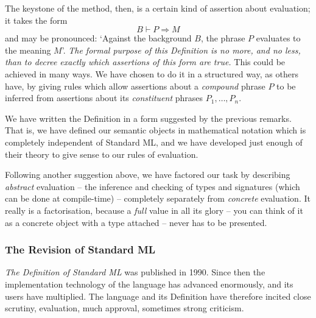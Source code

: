 The keystone of the method, then, is a certain kind of assertion about
evaluation; it takes the form
\[ B\vdash P\Rightarrow M\]
and may be pronounced: `Against the background $B$, the phrase $P$ evaluates
to the meaning $M$'.  {\sl The formal purpose of this Definition is no more, 
and no less, than to decree exactly which assertions of this form are true.}
This could be achieved in many ways. We have chosen to do it in a structured
way, as others have, by giving rules which allow assertions about a 
{\sl compound} phrase $P$ to be inferred from assertions about its
{\sl constituent} phrases $P_1,\ldots,P_n$.

We have written the Definition in a form suggested by the previous remarks.
That is, we have defined our semantic objects in mathematical
notation which is completely independent of Standard ML, and we have
developed just enough of their theory to give sense to our rules of
evaluation. 

   Following another suggestion above, we have factored our task
by describing {\sl abstract} evaluation -- the inference and checking of
types and signatures (which can be done at compile-time) -- completely 
separately from {\sl concrete} evaluation.  
It really is a factorisation, because a {\sl full} value in all its glory --
you can think of it as a concrete object with a type
attached -- never has to be presented.


\subsubsection*{The Revision of Standard ML}
{\it The Definition of Standard ML} was published in 1990.  
Since then the implementation technology of
the language has advanced enormously, and its users have 
multiplied.  The language and its Definition 
have therefore incited close scrutiny, evaluation, much approval, 
sometimes strong criticism.

